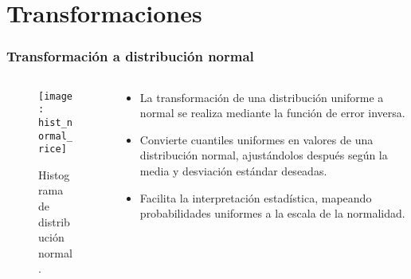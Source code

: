 
\section{Transformaciones}

\begin{frame}
	\frametitle{Transformación a distribución normal}
		
		\begin{columns}
			
			\begin{column}{0.5\textwidth} %
				\begin{figure}
					\centering
					\texttt{[image: hist\_normal\_rice]} %
					\caption{Histograma de distribución normal.}
				\end{figure}
			\end{column}
			
			\begin{column}{0.5\textwidth} %
				\begin{itemize}
					\item La transformación de una distribución uniforme a normal se realiza mediante la función de error inversa.
					\item Convierte cuantiles uniformes en valores de una distribución normal, ajustándolos después según la media y desviación estándar deseadas.
					\item Facilita la interpretación estadística, mapeando probabilidades uniformes a la escala de la normalidad.
				\end{itemize}
			\end{column}
		\end{columns}
\end{frame}


